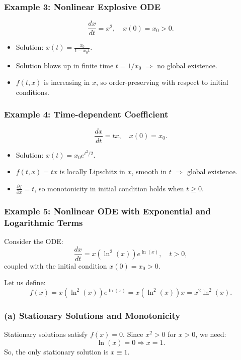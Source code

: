 \subsubsection*{Example 3: Nonlinear Explosive ODE}
\begin{equation*}
\frac{dx}{dt} = x^2, \quad x(0) = x_0 > 0.
\end{equation*}

\begin{itemize}
  \item Solution: $x(t) = \frac{x_0}{1 - x_0 t}$.
  \item Solution blows up in finite time $t = 1/x_0$ $\Rightarrow$ no global existence.
  \item $f(t,x)$ is increasing in $x$, so order-preserving with respect to initial conditions.
\end{itemize}

\subsubsection*{Example 4: Time-dependent Coefficient}
\begin{equation*}
\frac{dx}{dt} = t x, \quad x(0) = x_0.
\end{equation*}

\begin{itemize}
  \item Solution: $x(t) = x_0 e^{t^2/2}$.
  \item $f(t,x) = t x$ is locally Lipschitz in $x$, smooth in $t$ $\Rightarrow$ global existence.
  \item $\frac{\partial f}{\partial x} = t$, so monotonicity in initial condition holds when $t \geq 0$.
\end{itemize}

\subsubsection*{Example 5: Nonlinear ODE with Exponential and Logarithmic Terms}
Consider the ODE:
\begin{equation*}
\frac{dx}{dt} = x(\ln^2(x)) e^{\ln(x)}, \quad t > 0,
\end{equation*}
coupled with the initial condition $x(0) = x_0 > 0$.

Let us define:
\[ f(x) = x (\ln^2(x)) e^{\ln(x)} = x (\ln^2(x)) x = x^2 \ln^2(x). \]

\subsubsection*{(a) Stationary Solutions and Monotonicity}
Stationary solutions satisfy $f(x) = 0$. Since $x^2 > 0$ for $x > 0$, we need:
\[ \ln(x) = 0 \Rightarrow x = 1. \]
So, the only stationary solution is $x \equiv 1$.

